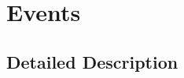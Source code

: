 \hypertarget{group____events}{\section{Events}
\label{group____events}
}


\subsection{Detailed Description}
